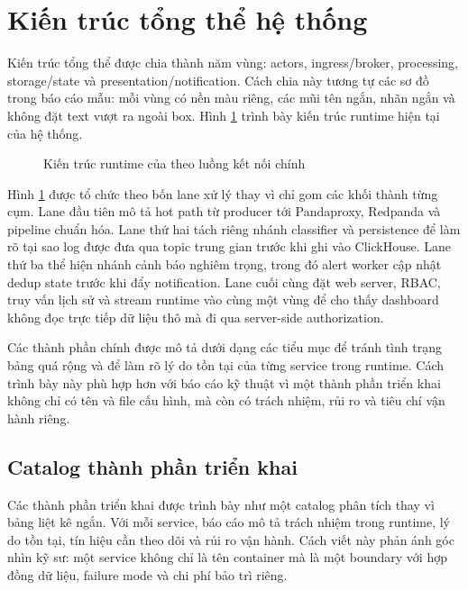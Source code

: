 \section{Kiến trúc tổng thể hệ thống}

Kiến trúc tổng thể được chia thành năm vùng: actors, ingress/broker, processing, storage/state và presentation/notification. Cách chia này tương tự các sơ đồ trong báo cáo mẫu: mỗi vùng có nền màu riêng, các mũi tên ngắn, nhãn ngắn và không đặt text vượt ra ngoài box. Hình \ref{fig:architecture-landscape} trình bày kiến trúc runtime hiện tại của hệ thống.





\begin{figure}[H]
\centering
\makebox[\textwidth][c]{}
\caption{Kiến trúc runtime của \LogRider{} theo luồng kết nối chính}
\label{fig:architecture-landscape}
\end{figure}

Hình \ref{fig:architecture-landscape} được tổ chức theo bốn lane xử lý thay vì chỉ gom các khối thành từng cụm. Lane đầu tiên mô tả hot path từ producer tới Pandaproxy, Redpanda và pipeline chuẩn hóa. Lane thứ hai tách riêng nhánh classifier và persistence để làm rõ tại sao log được đưa qua topic trung gian trước khi ghi vào ClickHouse. Lane thứ ba thể hiện nhánh cảnh báo nghiêm trọng, trong đó alert worker cập nhật dedup state trước khi đẩy notification. Lane cuối cùng đặt web server, RBAC, truy vấn lịch sử và stream runtime vào cùng một vùng để cho thấy dashboard không đọc trực tiếp dữ liệu thô mà đi qua server-side authorization.



Các thành phần chính được mô tả dưới dạng các tiểu mục để tránh tình trạng bảng quá rộng và để làm rõ lý do tồn tại của từng service trong runtime. Cách trình bày này phù hợp hơn với báo cáo kỹ thuật vì một thành phần triển khai không chỉ có tên và file cấu hình, mà còn có trách nhiệm, rủi ro và tiêu chí vận hành riêng.

\subsection{Catalog thành phần triển khai}

Các thành phần triển khai được trình bày như một catalog phân tích thay vì bảng liệt kê ngắn. Với mỗi service, báo cáo mô tả trách nhiệm trong runtime, lý do tồn tại, tín hiệu cần theo dõi và rủi ro vận hành. Cách viết này phản ánh góc nhìn kỹ sư: một service không chỉ là tên container mà là một boundary với hợp đồng dữ liệu, failure mode và chi phí bảo trì riêng.

